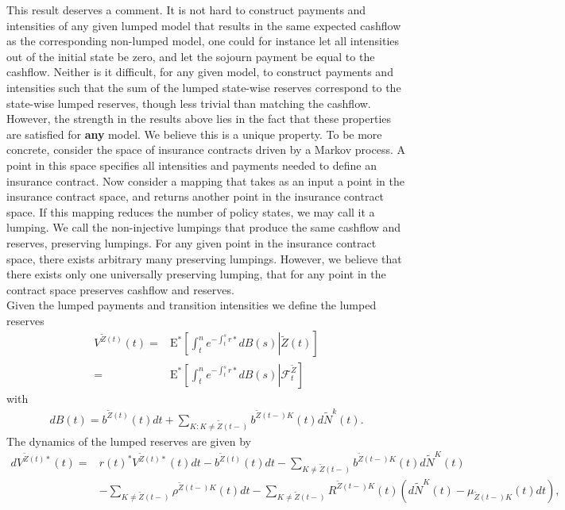 \documentclass[12pt]{article}
\newcommand{\E}{\text{E}}
\theoremstyle{my_thm}
\begin{document}
This result deserves a comment. It is not hard to construct payments and intensities of any given lumped model that results in the same expected cashflow as the corresponding non-lumped model, one could for instance let all intensities out of the initial state be zero, and let the sojourn payment be equal to the cashflow. Neither is it difficult, for any given model, to construct payments and intensities such that the sum of the lumped state-wise reserves correspond to the state-wise lumped reserves, though less trivial than matching the cashflow. However, the strength in the results above lies in the fact that these properties are satisfied for \textbf{any} model. We believe this is a unique property. To be more concrete, consider the space of insurance contracts driven by a Markov process. A point in this space specifies all intensities and payments needed to define an insurance contract. Now consider a mapping that takes as an input a point in the insurance contract space, and returns another point in the insurance contract space. If this mapping reduces the number of policy states, we may call it a lumping. We call the non-injective lumpings that produce the same cashflow and reserves, preserving lumpings. For any given point in the insurance contract space, there exists arbitrary many preserving lumpings. However, we believe that there exists only one universally preserving lumping, that for any point in the contract space preserves cashflow and reserves. 
\\[12pt]
Given the lumped payments and transition intensities we define the lumped reserves
\begin{align*}
V^{\tilde{Z}(t)}(t)=&\E^* \left. \left[ \int_t^n e^{-\int_t^s r*} dB(s) \right| \tilde{Z}(t) \right]
\\
=&
\E^* \left. \left[ \int_t^n e^{-\int_t^s r*} dB(s) \right| \mathcal{F}_t^{\tilde{Z}} \right]
\end{align*}
with
\begin{align*}
dB(t)=b^{\tilde{Z}(t)}(t) dt +\sum_{K:K \neq \tilde{Z}(t-)} b^{\tilde{Z}(t-)K}(t)d\tilde{N}^k(t).
\end{align*}
The dynamics of the lumped reserves are given by
\begin{align*}
dV^{\tilde{Z}(t)*}(t)=& r(t)^*V^{\tilde{Z}(t)*}(t)dt -b^{\tilde{Z}(t)}(t)dt - \sum_{K \neq \tilde{Z}(t-)} b^{\tilde{Z}(t-)K}(t) d\tilde{N}^K(t)\\
&-\sum_{K \neq \tilde{Z}(t-)} \rho^{\tilde{Z}(t-)K}(t) dt - \sum_{K \neq \tilde{Z}(t-)} R^{\tilde{Z}(t-)K}(t) (d\tilde{N}^K(t)- \mu_{\tilde{Z}(t-)K}(t) dt),
\end{align*}
\end{document}
